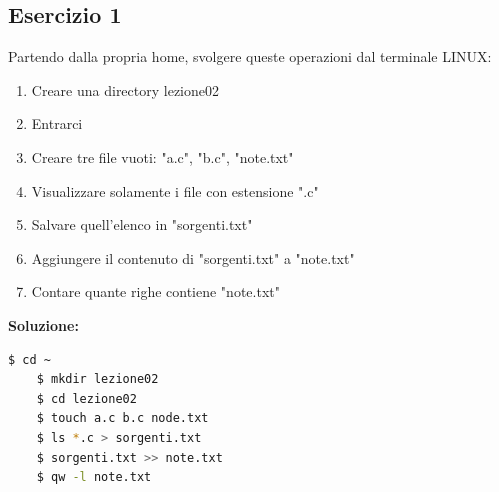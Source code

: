 \documentclass[12pt,a4paper]{article}
\begin{document}
\subsection{Esercizio 1}
Partendo dalla propria home, svolgere queste operazioni dal terminale LINUX:
\begin{enumerate}
    \item Creare una directory lezione02
    \item Entrarci
    \item Creare tre file vuoti: "a.c", "b.c", "note.txt"
    \item Visualizzare solamente i file con estensione ".c"
    \item Salvare quell'elenco in "sorgenti.txt"
    \item Aggiungere il contenuto di "sorgenti.txt" a "note.txt"
    \item Contare quante righe contiene "note.txt"
\end{enumerate}
\textbf{Soluzione:}
\begin{lstlisting}[language=bash]
    $ cd ~
    $ mkdir lezione02
    $ cd lezione02
    $ touch a.c b.c node.txt
    $ ls *.c > sorgenti.txt
    $ sorgenti.txt >> note.txt
    $ qw -l note.txt
\end{lstlisting}
\end{document}
